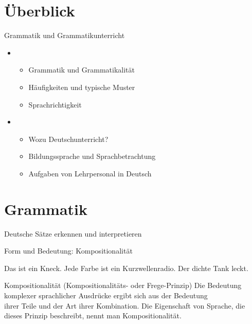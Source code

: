\section{Überblick}

\begin{frame}
  {Grammatik und Grammatikunterricht}
  \onslide<+->
  \begin{itemize}[<+->]
    \item {}
      \begin{itemize}
        \item Grammatik und Grammatikalität
        \item Häufigkeiten und typische Muster
        \item Sprachrichtigkeit
      \end{itemize}
      \Zeile
    \item {}
      \begin{itemize}
        \item Wozu Deutschunterricht?
        \item Bildungssprache und Sprachbetrachtung
        \item Aufgaben von Lehrpersonal in Deutsch
      \end{itemize}
  \end{itemize}
\end{frame}


\section{Grammatik}

\begin{frame}
  {Deutsche Sätze erkennen und interpretieren}
  \onslide<+->
  \onslide<+->
  \begin{exe}
    \onslide<+->
    \onslide<+->
    \onslide<+->
    \onslide<+->
    \Zeile
  \end{exe}
\end{frame}


\begin{frame}
  {Form und Bedeutung: Kompositionalität}
  \onslide<+->
  \onslide<+->
  \begin{exe}
    \ex Das ist ein Kneck.
    \onslide<+->
    \Zeile
  \ex Jede Farbe ist ein Kurzwellenradio.
  \ex Der dichte Tank leckt.
\end{exe}
    \Zeile
  \onslide<+->

  \begin{block}{Kompositionalität (Kompositionalitäts- oder Frege-Prinzip)}
    Die Bedeutung komplexer sprachlicher Ausdrücke ergibt sich aus der Bedeutung\\
    ihrer Teile und der Art ihrer Kombination. Die Eigenschaft von Sprache,
    die dieses Prinzip beschreibt, nennt man Kompositionalität.
  \end{block}
\end{frame}

